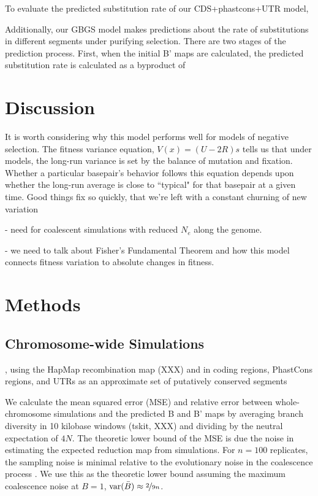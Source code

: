 \documentclass[11pt]{article}
\DeclareMathOperator{\var}{var}
\begin{document}
To evaluate the predicted substitution rate of our CDS+phastcons+UTR model, 


Additionally, our GBGS model makes predictions about the rate of substitutions
in different segments under purifying selection. There are two stages of the
prediction process. First, when the initial B' maps are calculated, the
predicted substitution rate is calculated as a byproduct of 

\section*{Discussion}

It is worth considering why this model performs well for models of negative
selection. The fitness variance equation, $V(x) = (U-2R)s$ tells us that under
models, the long-run variance is set by the balance of mutation and fixation.
Whether a particular basepair's behavior follows this equation depends upon
whether the long-run average is close to ``typical" for that basepair at a
given time. Good things fix so quickly, that we're left with a constant
churning of new variation

- need for coalescent simulations with reduced $N_e$ along the genome.

- we need to talk about Fisher's Fundamental Theorem and how this model
connects fitness variation to absolute changes in fitness.


\section*{Methods}


\subsection*{Chromosome-wide Simulations}

, using the HapMap recombination map (XXX) and in coding regions, PhastCons
regions, and UTRs as an approximate set of putatively conserved segments

We calculate the mean squared error (MSE) and relative error between
whole-chromosome simulations and the predicted B and B' maps by averaging
branch diversity in 10 kilobase windows (tskit, XXX) and dividing by the
neutral expectation of $4N$. The theoretic lower bound of the MSE is due the
noise in estimating the expected reduction map from simulations. For $n=100$
replicates, the sampling noise is minimal relative to the evolutionary noise in
the coalescence process \parencite{Tajima1983-gu}. We use this as the theoretic
lower bound assuming the maximum coalescence noise at $B=1$, $\var(\bar{B})
\approx \nicefrac{2}{9n}$.
\end{document}
